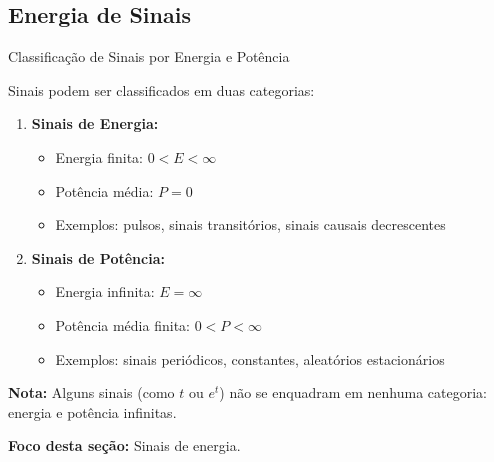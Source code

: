 
\subsection{Energia de Sinais}

\begin{frame}{Classificação de Sinais por Energia e Potência}

Sinais podem ser classificados em duas categorias:

\begin{enumerate}
\item \textbf{Sinais de Energia:}
   \begin{itemize}
   \item Energia finita: $0 < E < \infty$
   \item Potência média: $P = 0$
   \item Exemplos: pulsos, sinais transitórios, sinais causais decrescentes
   \end{itemize}

\item \textbf{Sinais de Potência:}
   \begin{itemize}
   \item Energia infinita: $E = \infty$
   \item Potência média finita: $0 < P < \infty$
   \item Exemplos: sinais periódicos, constantes, aleatórios estacionários
   \end{itemize}
\end{enumerate}

\vspace{0.1cm}

\textbf{Nota:} Alguns sinais (como $t$ ou $e^t$) não se enquadram em nenhuma categoria: energia e potência infinitas.

\textbf{Foco desta seção:} Sinais de energia.

\end{frame}


